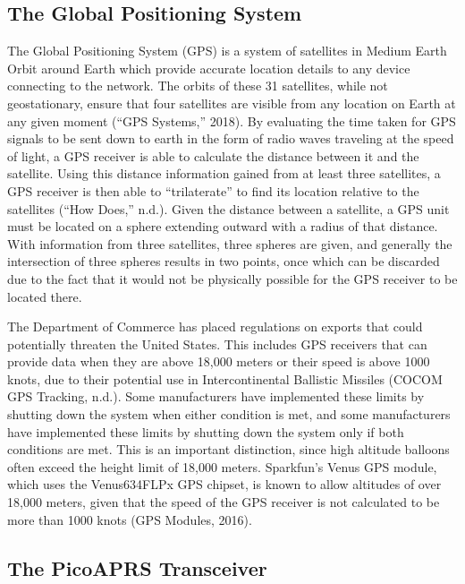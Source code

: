 \documentclass[12pt,]{article}
\begin{document}
\subsection{The Global Positioning
System}\label{the-global-positioning-system}

The Global Positioning System (GPS) is a system of satellites in Medium
Earth Orbit around Earth which provide accurate location details to any
device connecting to the network. The orbits of these 31 satellites,
while not geostationary, ensure that four satellites are visible from
any location on Earth at any given moment (``GPS Systems,'' 2018). By
evaluating the time taken for GPS signals to be sent down to earth in
the form of radio waves traveling at the speed of light, a GPS receiver
is able to calculate the distance between it and the satellite. Using
this distance information gained from at least three satellites, a GPS
receiver is then able to ``trilaterate'' to find its location relative
to the satellites (``How Does,'' n.d.). Given the distance between a
satellite, a GPS unit must be located on a sphere extending outward with
a radius of that distance. With information from three satellites, three
spheres are given, and generally the intersection of three spheres
results in two points, once which can be discarded due to the fact that
it would not be physically possible for the GPS receiver to be located
there.

The Department of Commerce has placed regulations on exports that could
potentially threaten the United States. This includes GPS receivers that
can provide data when they are above 18,000 meters or their speed is
above 1000 knots, due to their potential use in Intercontinental
Ballistic Missiles (COCOM GPS Tracking, n.d.). Some manufacturers have
implemented these limits by shutting down the system when either
condition is met, and some manufacturers have implemented these limits
by shutting down the system only if both conditions are met. This is an
important distinction, since high altitude balloons often exceed the
height limit of 18,000 meters. Sparkfun's Venus GPS module, which uses
the Venus634FLPx GPS chipset, is known to allow altitudes of over 18,000
meters, given that the speed of the GPS receiver is not calculated to be
more than 1000 knots (GPS Modules, 2016).

\subsection{The PicoAPRS Transceiver}\label{the-picoaprs-transceiver}
\end{document}
